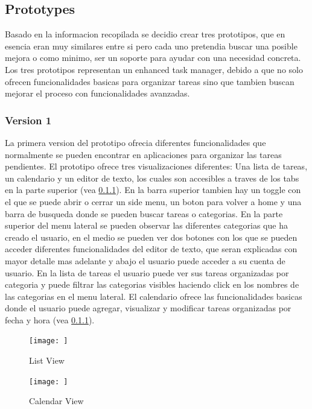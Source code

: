 \subsection{Prototypes}
Basado en la informacion recopilada se decidio crear tres prototipos, que en esencia eran muy similares entre si pero cada uno pretendia buscar una posible mejora o como minimo, ser un soporte para ayudar con una necesidad concreta. Los tres prototipos representan un enhanced task manager, debido a que no solo ofrecen funcionalidades basicas para organizar tareas sino que tambien buscan mejorar el proceso con funcionalidades avanzadas.

\subsubsection{Version 1}
La primera version del prototipo ofrecia diferentes funcionalidades que normalmente se pueden encontrar en aplicaciones para organizar las tareas pendientes. El prototipo ofrece tres visualizaciones diferentes: Una lista de tareas, un calendario y un editor de texto, los cuales son accesibles a traves de los tabs en la parte superior (vea \ref{}). En la barra superior tambien hay un toggle con el que se puede abrir o cerrar un side menu, un boton para volver a home y una barra de busqueda donde se pueden buscar tareas o categorias. En la parte superior del menu lateral se pueden observar las diferentes categorias que ha creado el usuario, en el medio se pueden ver dos botones con los que se pueden acceder diferentes funcionalidades del editor de texto, que seran explicadas con mayor detalle mas adelante y abajo el usuario puede acceder a su cuenta de usuario. En la lista de tareas el usuario puede ver sus tareas organizadas por categoria y puede filtrar las categorias visibles haciendo click en los nombres de las categorias en el menu lateral. El calendario ofrece las funcionalidades basicas donde el usuario puede agregar, visualizar y modificar tareas organizadas por fecha y hora (vea \ref{}).

\begin{figure}
    \centering
    \texttt{[image: ]}
    \caption{List View}
    \label{fig:my_label}
\end{figure}

\begin{figure}
    \centering
    \texttt{[image: ]}
    \caption{Calendar View}
    \label{fig:my_label}
\end{figure}

